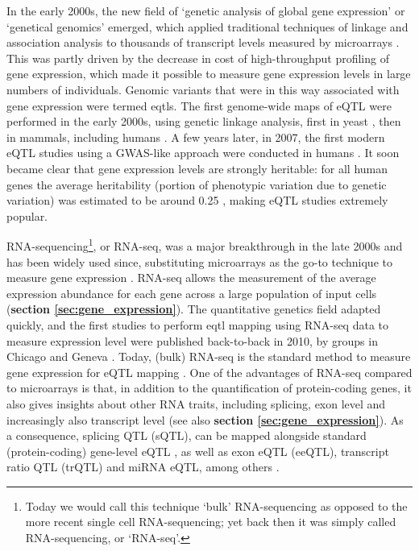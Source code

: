 In the early 2000s, the new field of `genetic analysis of global gene expression' or `genetical genomics' \cite{jansen2001genetical} emerged, which applied traditional techniques of linkage and association analysis to thousands of transcript levels measured by microarrays \cite{rockman2006genetics}.
This was partly driven by the decrease in cost of high-throughput profiling of gene expression, which made it possible to measure gene expression levels in large numbers of individuals.
Genomic variants that were in this way associated with gene expression were termed \glspl{eqtl}. 
The first genome-wide maps of eQTL were performed in the early 2000s, using genetic linkage analysis, first in yeast \cite{brem2002genetic}, then in mammals, including humans \cite{schadt2003genetics}. 
A few years later, in 2007, the first modern eQTL studies using a GWAS-like approach were conducted in humans \cite{stranger2007population, dixon2007genome}. 
It soon became clear that gene expression levels are strongly heritable: for all human genes the average heritability (portion of phenotypic variation due to genetic variation) was estimated to be around 0.25 \cite{ricano2013mapping, dunham2012integrated, maurano2012systematic, westra2014genome}, making eQTL studies extremely popular.

RNA-sequencing\footnote{Today we would call this technique `bulk' RNA-sequencing as opposed to the more recent single cell RNA-sequencing; yet back then it was simply called RNA-sequencing, or `RNA-seq'.}, or RNA-seq, was a major breakthrough in the late 2000s and has been widely used since, substituting microarrays as the go-to technique to measure gene expression \cite{weber2015discovering}.
RNA-seq allows the measurement of the average expression abundance for each gene across a large population of input cells (\textbf{section 
\ref{sec:gene_expression}}).
The quantitative genetics field adapted quickly, and the first studies to perform \gls{eqtl} mapping using RNA-seq data to measure expression level were published back-to-back in 2010, by groups in Chicago and Geneva \cite{montgomery2010transcriptome, pickrell2010understanding}.
Today, (bulk) RNA-seq is the standard method to measure gene expression for eQTL mapping \cite{lappalainen2013transcriptome, gtex2015genotype, chen2016genetic}.
One of the advantages of RNA-seq compared to microarrays is that, in addition to the quantification of protein-coding genes, it also  gives insights about other RNA traits, including splicing, exon level and increasingly also transcript level (see also\textbf{ section 
\ref{sec:gene_expression}}).
As a consequence, splicing QTL (sQTL), can be mapped alongside standard (protein-coding) gene-level eQTL \cite{pickrell2010understanding, montgomery2010transcriptome}, as well as exon eQTL (eeQTL), transcript ratio QTL (trQTL) and miRNA eQTL, among others \cite{lappalainen2013transcriptome, bonder2019systematic}.
 
